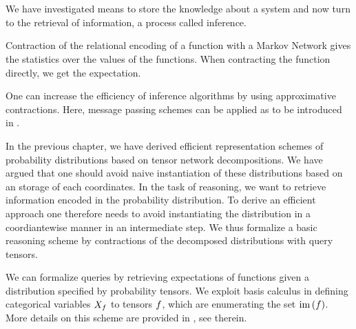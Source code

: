 \chapter{\chatextprobReasoning}\label{cha:probReasoning}

We have investigated means to store the knowledge about a system and now turn to the retrieval of information, a process called inference.

% 
Contraction of the relational encoding of a function with a Markov Network gives the statistics over the values of the functions.
When contracting the function directly, we get the expectation.

One can increase the efficiency of inference algorithms by using approximative contractions.
Here, message passing schemes can be applied as to be introduced in .



In the previous chapter, we have derived efficient representation schemes of probability distributions based on tensor network decompositions.
We have argued that one should avoid naive instantiation of these distributions based on an storage of each coordinates.
In the task of reasoning, we want to retrieve information encoded in the probability distribution.
To derive an efficient approach one therefore needs to avoid instantiating the distribution in a coordiantewise manner in an intermediate step.
We thus formalize a basic reasoning scheme by contractions of the decomposed distributions with query tensors.


We can formalize queries by retrieving expectations of functions given a distribution specified by probability tensors. 
We exploit basis calculus in defining categorical variables $X_{f}$ to tensors $f$, which are enumerating the set $\mathrm{im}\left(f\right)$.
More details on this scheme are provided in , see  therein.

